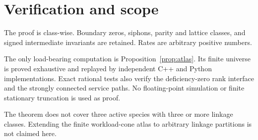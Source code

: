 \documentclass[11pt]{article}
\theoremstyle{definition}\newtheorem{definition}[theorem]{Definition}
\theoremstyle{remark}\newtheorem{remark}[theorem]{Remark}
\begin{document}
\section{Verification and scope}

The proof is class-wise.  Boundary zeros, siphons, parity and lattice classes, and signed intermediate invariants are retained.  Rates are arbitrary positive numbers.

The only load-bearing computation is Proposition~\ref{prop:atlas}.  Its finite universe is proved exhaustive and replayed by independent C++ and Python implementations.  Exact rational tests also verify the deficiency-zero rank interface and the strongly connected service paths.  No floating-point simulation or finite stationary truncation is used as proof.

The theorem does not cover three active species with three or more linkage classes.  Extending the finite workload-cone atlas to arbitrary linkage partitions is not claimed here.
\end{document}
